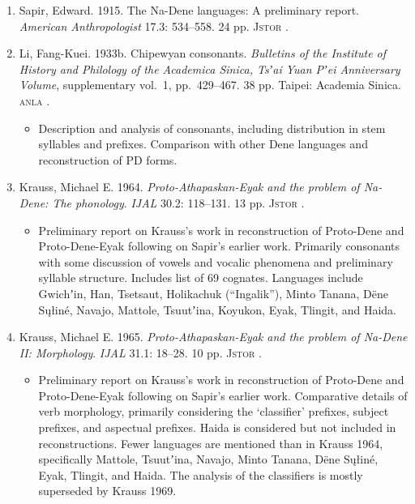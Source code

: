 \documentclass[12pt,letterpaper,oneside,article]{memoir}
\begin{document}
\begin{enumerate}
\item	Sapir, Edward.
	1915.
	The Na-Dene languages: A preliminary report.
	\textit{American Anthropologist} 17.3: 534–558.
	24 pp.
	\textsc{Jstor} .
\item	Li, Fang-Kuei.
	1933b.
	Chipewyan consonants.
	\textit{Bulletins of the Institute of History and Philology of the Academica Sinica,
		Tsʼai Yuan Pʼei Anniversary Volume},
		supplementary vol.\ 1, pp.\ 429–467.
	38 pp.
	Taipei: Academia Sinica.
	\textsc{anla} .
	\begin{itemize}
	\item	Description and analysis of consonants, including distribution in stem
		syllables and prefixes.
		Comparison with other Dene languages and reconstruction of PD forms.
	\end{itemize}
\item	Krauss, Michael E.
	1964.
	\textit{Proto-Athapaskan-Eyak and the problem of Na-Dene: The phonology}.
	\textit{IJAL} 30.2: 118–131.
	13 pp.
	\textsc{Jstor} .
	\begin{itemize}
	\item	Preliminary report on Krauss’s work in reconstruction of Proto-Dene
		and Proto-Dene-Eyak following on Sapir’s earlier work.
		Primarily consonants with some discussion of vowels and vocalic
		phenomena and preliminary syllable structure.
		Includes list of 69 cognates.
		Languages include Gwichʼin, Han, Tsetsaut, Holikachuk (“Ingalik”),
		Minto Tanana, Dëne Sųłiné, Navajo, Mattole, Tsuutʼina, Koyukon,
		Eyak, Tlingit, and Haida.
	\end{itemize}
\item	Krauss, Michael E.
	1965.
	\textit{Proto-Athapaskan-Eyak and the problem of Na-Dene II: Morphology}.
	\textit{IJAL} 31.1: 18–28.
	10 pp.
	\textsc{Jstor} .
	\begin{itemize}
	\item	Preliminary report on Krauss’s work in reconstruction of Proto-Dene
		and Proto-Dene-Eyak following on Sapir’s earlier work.
		Comparative details of verb morphology, primarily considering the
		‘classifier’ prefixes, subject prefixes, and aspectual prefixes.
		Haida is considered but not included in reconstructions.
		Fewer languages are mentioned than in Krauss 1964, specifically 
		Mattole, Tsuutʼina, Navajo, Minto Tanana, Dëne Sųłiné, Eyak,
		Tlingit, and Haida.
		The analysis of the classifiers is mostly superseded by Krauss 1969.

\end{itemize}
\end{enumerate}
\end{document}
